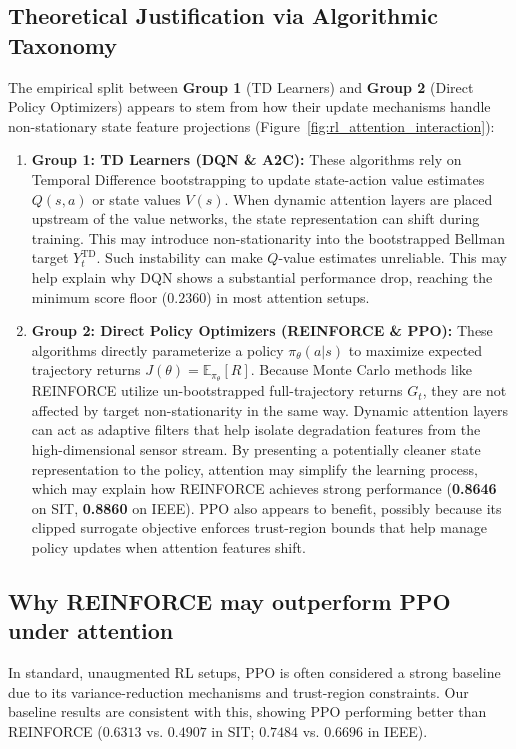 \documentclass[sn-basic]{sn-jnl}%
\begin{document}
\subsection{Theoretical Justification via Algorithmic Taxonomy}
The empirical split between \textbf{Group 1} (TD Learners) and \textbf{Group 2} (Direct Policy Optimizers) appears to stem from how their update mechanisms handle non-stationary state feature projections (Figure~\ref{fig:rl_attention_interaction}):

\begin{enumerate}
	\item \textbf{Group 1: TD Learners (\textsc{DQN} \& \textsc{A2C}):} These algorithms rely on Temporal Difference bootstrapping to update state-action value estimates $Q(s,a)$ or state values $V(s)$. When dynamic attention layers are placed upstream of the value networks, the state representation can shift during training. This may introduce non-stationarity into the bootstrapped Bellman target $Y_t^{\text{TD}}$. Such instability can make $Q$-value estimates unreliable. This may help explain why \textsc{DQN} shows a substantial performance drop, reaching the minimum score floor ($0.2360$) in most attention setups.
    
	\item \textbf{Group 2: Direct Policy Optimizers (\textsc{REINFORCE} \& \textsc{PPO}):} These algorithms directly parameterize a policy $\pi_\theta(a|s)$ to maximize expected trajectory returns $J(\theta) = \mathbb{E}_{\pi_\theta}[R]$. Because Monte Carlo methods like \textsc{REINFORCE} utilize un-bootstrapped full-trajectory returns $G_t$, they are not affected by target non-stationarity in the same way. Dynamic attention layers can act as adaptive filters that help isolate degradation features from the high-dimensional sensor stream. By presenting a potentially cleaner state representation to the policy, attention may simplify the learning process, which may explain how \textsc{REINFORCE} achieves strong performance (\textbf{0.8646} on SIT, \textbf{0.8860} on IEEE). \textsc{PPO} also appears to benefit, possibly because its clipped surrogate objective enforces trust-region bounds that help manage policy updates when attention features shift.
\end{enumerate}

\subsection{Why \textsc{REINFORCE} may outperform \textsc{PPO} under attention}
In standard, unaugmented RL setups, \textsc{PPO} is often considered a strong baseline due to its variance-reduction mechanisms and trust-region constraints. Our baseline results are consistent with this, showing \textsc{PPO} performing better than \textsc{REINFORCE} ($0.6313$ vs. $0.4907$ in SIT; $0.7484$ vs. $0.6696$ in IEEE). 
\end{document}

